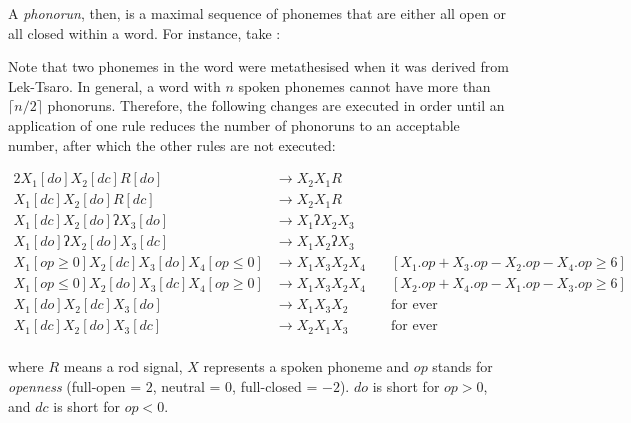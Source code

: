 \documentclass{book}
\begin{document}
A \emph{phonorun}, then, is a maximal sequence of phonemes that are either all open or all closed within a word. For instance, take :

\begin{center}
\end{center}

Note that two phonemes in the word were metathesised when it was derived from Lek-Tsaro. In general, a word with $n$ spoken phonemes cannot have more than $\lceil n/2 \rceil$ phonoruns. Therefore, the following changes are executed in order until an application of one rule reduces the number of phonoruns to an acceptable number, after which the other rules are not executed:

\begin{alignat*}{2}
  X_1[do] X_2[dc] R[do] &\rightarrow X_2 X_1 R \\
  X_1[dc] X_2[do] R[dc] &\rightarrow X_2 X_1 R \\
  X_1[dc] X_2[do] \text{ʔ} X_3[do] &\rightarrow X_1 \text{ʔ} X_2 X_3 \\
  X_1[do] \text{ʔ} X_2[do] X_3[dc] &\rightarrow X_1 X_2 \text{ʔ} X_3 \\
  X_1[op \ge 0] X_2[dc] X_3[do] X_4[op \le 0] &\rightarrow X_1 X_3 X_2 X_4 &\quad[X_1.op + X_3.op - X_2.op - X_4.op \ge 6] \\
  X_1[op \le 0] X_2[do] X_3[dc] X_4[op \ge 0] &\rightarrow X_1 X_3 X_2 X_4 &\quad[X_2.op + X_4.op - X_1.op - X_3.op \ge 6] \\
  X_1[do] X_2[dc] X_3[do] &\rightarrow X_1 X_3 X_2 &\quad\text{for ever} \\
  X_1[dc] X_2[do] X_3[dc] &\rightarrow X_2 X_1 X_3 &\quad\text{for ever} \\
\end{alignat*}

where $R$ means a rod signal, $X$ represents a spoken phoneme and $op$ stands for \emph{openness} (full-open = $2$, neutral = $0$, full-closed = $-2$). $do$ is short for $op > 0$, and $dc$ is short for $op < 0$. 
\end{document}
